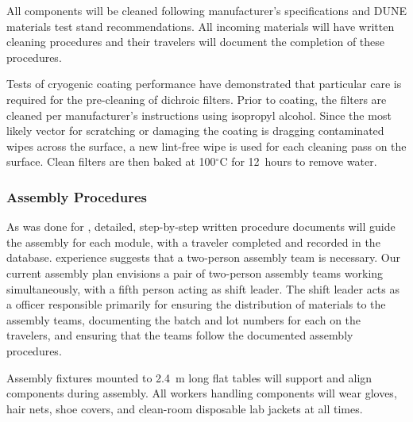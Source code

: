 All components will be cleaned %
following manufacturer's specifications and DUNE materials test stand recommendations.  %
All incoming materials will have written cleaning procedures and their travelers will document the completion of these procedures.

Tests of cryogenic coating performance have demonstrated that particular care is required for the pre-cleaning of dichroic filters.  Prior to coating, the filters are cleaned per manufacturer's instructions %
using isopropyl alcohol. Since the most likely vector for scratching or damaging the coating is dragging contaminated wipes across the surface, a new %
lint-free wipe is used for each  cleaning pass on the surface. Clean filters are then baked at 100$^\circ$C for \SI{12}{hours} to remove water. 

\subsubsection{Assembly Procedures}

As was done for , detailed, step-by-step written procedure documents will %
guide the assembly for each  module, with a  traveler%
completed and recorded in the database.   experience suggests that a two-person assembly team is necessary. %
Our current assembly plan envisions a pair of two-person assembly teams working simultaneously, %
with a fifth person acting as shift leader.  The shift leader %
acts as a  officer responsible primarily for ensuring the distribution of materials to the assembly teams, documenting the batch and lot numbers for each  on the %
travelers, and ensuring that the teams follow the documented assembly procedures. %

Assembly fixtures mounted to \SI{2.4}{m} long flat tables will %
support and align  components during assembly.  All workers handling  components will wear gloves, hair nets, shoe covers, and clean-room disposable lab jackets at all times.

